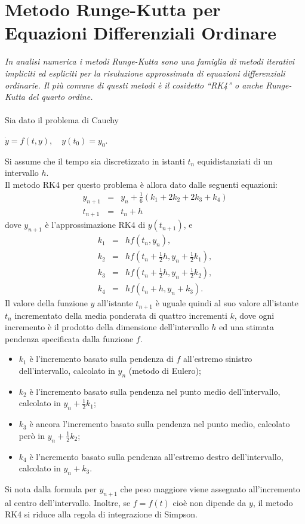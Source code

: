 \chapter{\huge Metodo Runge-Kutta per Equazioni Differenziali Ordinare}

\textit{In analisi numerica i metodi Runge-Kutta sono una famiglia di metodi iterativi impliciti ed espliciti per la risuluzione approssimata di equazioni differenziali ordinarie. Il più comune di questi metodi è il cosidetto ``RK4'' o anche Runge-Kutta del quarto ordine.}
\\\\
Sia dato il problema di Cauchy
\begin{center}
$ \dot y = f(t, y), \quad y(t_0) = y_0.$
\end{center}
Si assume che il tempo sia discretizzato in istanti $t_n$ equidistanziati di un intervallo $h$.\\
Il metodo RK4 per questo problema è allora dato dalle seguenti equazioni:
\begin{eqnarray*}
y_{n+1} &=& y_n + \tfrac{1}{6} \left(k_1 + 2k_2 + 2k_3 + k_4 \right)\\
t_{n+1} &=& t_n + h
\end{eqnarray*}
dove $y_{n+1}$ è l'approssimazione RK4 di $y(t_{n+1})$, e
\begin{eqnarray*}
k_1 &=& hf(t_n, y_n),\\
k_2 &=& hf(t_n + \tfrac{1}{2}h , y_n + \tfrac{1}{2} k_1),\\
k_3 &=& hf(t_n + \tfrac{1}{2}h , y_n + \tfrac{1}{2} k_2),\\
k_4 &=& hf(t_n + h , y_n + k_3).
\end{eqnarray*}
Il valore della funzione $y$ all'istante $t_{n+1}$ è uguale quindi al suo valore all'istante $t_n$ incrementato della media ponderata di quattro incrementi $k$, dove ogni incremento è il prodotto della dimensione dell'intervallo $h$ ed una stimata pendenza specificata dalla funzione $f$.
\begin{itemize}
\item $k_1$ è l'incremento basato sulla pendenza di $f$ all'estremo sinistro dell'intervallo, calcolato in $y_n$ (metodo di Eulero);
\item $k_2$ è l'incremento basato sulla pendenza nel punto medio dell'intervallo, calcolato in $y_n+\frac{1}{2}k_1$;
\item $k_3$ è ancora l'incremento basato sulla pendenza nel punto medio, calcolato però in $y_n+\frac{1}{2}k_2$;
\item $k_4$ è l'ncremento basato sulla pendenza all'estremo destro dell'intervallo, calcolato in $y_n+k_3$.
\end{itemize}
Si nota dalla formula per $y_{n+1}$ che peso maggiore viene assegnato all'incremento al centro dell'intervallo. Inoltre, se $f=f(t)$ cioè non dipende da $y$, il metodo RK4 si riduce alla regola di integrazione di Simpson.

